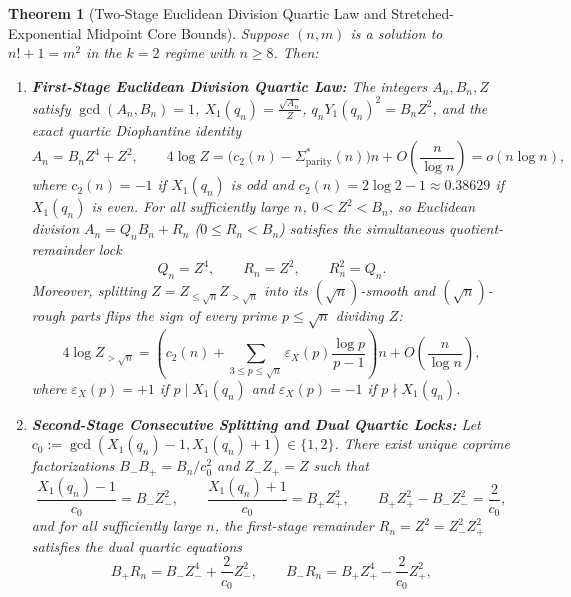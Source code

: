 \documentclass[11pt,reqno]{amsart}
\newtheorem{theorem}{Theorem}[section]
\theoremstyle{remark}
\numberwithin{equation}{section}
\newcommand{\Sparitys}{\Sigma_{\mathrm{parity}}^*}
\begin{document}
\begin{theorem}[{Two-Stage Euclidean Division Quartic Law and Stretched-Exponential Midpoint Core Bounds}]\label{thm:4.2}
Suppose $(n, m)$ is a solution to $n! + 1 = m^2$ in the $k = 2$ regime with $n \ge 8$. Then:
\begin{enumerate}
\item[(i)] \textbf{First-Stage Euclidean Division Quartic Law:} The integers $A_n, B_n, Z$ satisfy $\gcd(A_n, B_n) = 1$, $X_1(q_n) = \frac{\sqrt{A_n}}{Z}$, $q_n Y_1(q_n)^2 = B_n Z^2$, and the exact quartic Diophantine identity
\begin{equation}\label{eq:4.8}
A_n = B_n Z^4 + Z^2, \qquad 4\log Z = \bigl(c_2(n) - \Sparitys(n)\bigr)n + O\!\left(\frac{n}{\log n}\right) = o(n\log n),
\end{equation}
where $c_2(n) = -1$ if $X_1(q_n)$ is odd and $c_2(n) = 2\log 2 - 1 \approx 0.38629$ if $X_1(q_n)$ is even. For all sufficiently large $n$, $0 < Z^2 < B_n$, so Euclidean division $A_n = Q_n B_n + R_n$ ($0 \le R_n < B_n$) satisfies the simultaneous quotient-remainder lock
\begin{equation}\label{eq:4.9}
Q_n = Z^4, \qquad R_n = Z^2, \qquad R_n^2 = Q_n.
\end{equation}
Moreover, splitting $Z = Z_{\le \sqrt{n}} Z_{> \sqrt{n}}$ into its $(\sqrt{n})$-smooth and $(\sqrt{n})$-rough parts flips the sign of every prime $p \le \sqrt{n}$ dividing $Z$:
\begin{equation}\label{eq:4.10}
4\log Z_{> \sqrt{n}} = \left(c_2(n) + \sum_{3 \le p \le \sqrt{n}} \varepsilon_X(p)\frac{\log p}{p - 1}\right)n + O\!\left(\frac{n}{\log n}\right),
\end{equation}
where $\varepsilon_X(p) = +1$ if $p \mid X_1(q_n)$ and $\varepsilon_X(p) = -1$ if $p \nmid X_1(q_n)$.
\item[(ii)] \textbf{Second-Stage Consecutive Splitting and Dual Quartic Locks:} Let $c_0 := \gcd(X_1(q_n) - 1, X_1(q_n) + 1) \in \{1, 2\}$. There exist unique coprime factorizations $B_- B_+ = B_n / c_0^2$ and $Z_- Z_+ = Z$ such that
\begin{equation}\label{eq:4.11}
\frac{X_1(q_n) - 1}{c_0} = B_- Z_-^2, \qquad \frac{X_1(q_n) + 1}{c_0} = B_+ Z_+^2, \qquad B_+ Z_+^2 - B_- Z_-^2 = \frac{2}{c_0},
\end{equation}
and for all sufficiently large $n$, the first-stage remainder $R_n = Z^2 = Z_-^2 Z_+^2$ satisfies the dual quartic equations
\begin{equation}\label{eq:4.12}
B_+ R_n = B_- Z_-^4 + \frac{2}{c_0}Z_-^2, \qquad B_- R_n = B_+ Z_+^4 - \frac{2}{c_0}Z_+^2,

\end{equation}
\end{enumerate}
\end{theorem}
\end{document}

